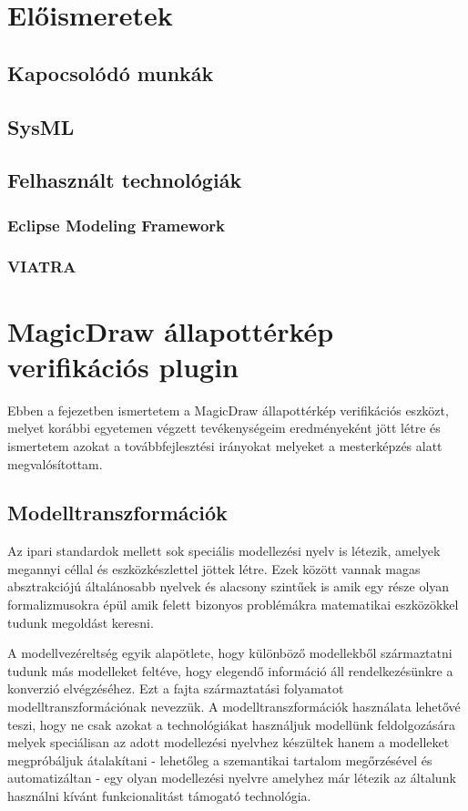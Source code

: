 \chapter{Előismeretek}

\section{Kapocsolódó munkák}
\section{SysML}
\section{Felhasznált technológiák}
\subsection{Eclipse Modeling Framework}
\subsection{VIATRA}


\chapter{MagicDraw állapottérkép verifikációs plugin}
Ebben a fejezetben ismertetem a MagicDraw állapottérkép verifikációs eszközt, melyet korábbi egyetemen végzett tevékenységeim eredményeként jött létre és ismertetem azokat a továbbfejlesztési irányokat melyeket a mesterképzés alatt megvalósítottam.

\section{Modelltranszformációk}

Az ipari standardok mellett sok speciális modellezési nyelv is létezik, amelyek megannyi céllal és eszközkészlettel jöttek létre. Ezek között vannak magas absztrakciójú általánosabb nyelvek és alacsony szintűek is amik egy része olyan formalizmusokra épül amik felett bizonyos problémákra matematikai eszközökkel tudunk megoldást keresni.

A modellvezéreltség egyik alapötlete, hogy különböző modellekből származtatni tudunk más modelleket feltéve, hogy elegendő információ áll rendelkezésünkre a konverzió elvégzéséhez. Ezt a fajta származtatási folyamatot modelltranszformációnak nevezzük. A modelltranszformációk használata lehetővé teszi, hogy ne csak azokat a technológiákat használjuk modellünk feldolgozására melyek speciálisan az adott modellezési nyelvhez készültek hanem a modelleket megpróbáljuk átalakítani - lehetőleg a szemantikai tartalom megőrzésével és automatizáltan - egy olyan modellezési nyelvre amelyhez már létezik az általunk használni kívánt funkcionalitást támogató technológia.


